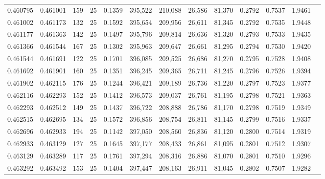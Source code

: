 \begin{tabular}{rrrrrrrrrrrrr}
0.460795 & 0.461001 &   159 &  25 &                                     0.1359 & 395,522 & 210,088 &  26,586 &  81,370 & 0.2792 & 0.7537 & 1.9461 \\
0.461002 & 0.461173 &   132 &  25 &                                     0.1592 & 395,654 & 209,956 &  26,611 &  81,345 & 0.2792 & 0.7535 & 1.9448 \\
0.461177 & 0.461363 &   142 &  25 &                                     0.1497 & 395,796 & 209,814 &  26,636 &  81,320 & 0.2793 & 0.7533 & 1.9435 \\
0.461366 & 0.461544 &   167 &  25 &                                     0.1302 & 395,963 & 209,647 &  26,661 &  81,295 & 0.2794 & 0.7530 & 1.9420 \\
0.461544 & 0.461691 &   122 &  25 &                                     0.1701 & 396,085 & 209,525 &  26,686 &  81,270 & 0.2795 & 0.7528 & 1.9408 \\
0.461692 & 0.461901 &   160 &  25 &                                     0.1351 & 396,245 & 209,365 &  26,711 &  81,245 & 0.2796 & 0.7526 & 1.9394 \\
0.461902 & 0.462115 &   176 &  25 &                                     0.1244 & 396,421 & 209,189 &  26,736 &  81,220 & 0.2797 & 0.7523 & 1.9377 \\
0.462116 & 0.462293 &   152 &  25 &                                     0.1412 & 396,573 & 209,037 &  26,761 &  81,195 & 0.2798 & 0.7521 & 1.9363 \\
0.462293 & 0.462512 &   149 &  25 &                                     0.1437 & 396,722 & 208,888 &  26,786 &  81,170 & 0.2798 & 0.7519 & 1.9349 \\
0.462515 & 0.462695 &   134 &  25 &                                     0.1572 & 396,856 & 208,754 &  26,811 &  81,145 & 0.2799 & 0.7516 & 1.9337 \\
0.462696 & 0.462933 &   194 &  25 &                                     0.1142 & 397,050 & 208,560 &  26,836 &  81,120 & 0.2800 & 0.7514 & 1.9319 \\
0.462933 & 0.463129 &   127 &  25 &                                     0.1645 & 397,177 & 208,433 &  26,861 &  81,095 & 0.2801 & 0.7512 & 1.9307 \\
0.463129 & 0.463289 &   117 &  25 &                                     0.1761 & 397,294 & 208,316 &  26,886 &  81,070 & 0.2801 & 0.7510 & 1.9296 \\
0.463292 & 0.463492 &   153 &  25 &                                     0.1404 & 397,447 & 208,163 &  26,911 &  81,045 & 0.2802 & 0.7507 & 1.9282 \\

\end{tabular}
